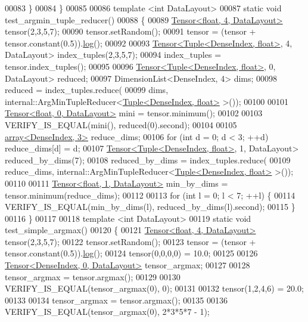 \begin{DoxyCode}
00083   \}
00084 \}
00085 
00086 \textcolor{keyword}{template} <\textcolor{keywordtype}{int} DataLayout>
00087 \textcolor{keyword}{static} \textcolor{keywordtype}{void} test\_argmin\_tuple\_reducer()
00088 \{
00089   \hyperlink{class_eigen_1_1_tensor}{Tensor<float, 4, DataLayout>} tensor(2,3,5,7);
00090   tensor.setRandom();
00091   tensor = (tensor + tensor.constant(0.5)).\hyperlink{structlog}{log}();
00092 
00093   \hyperlink{class_eigen_1_1_tensor}{Tensor<Tuple<DenseIndex, float>}, 4, DataLayout> index\_tuples(2,3,5,7);
00094   index\_tuples = tensor.index\_tuples();
00095 
00096   \hyperlink{class_eigen_1_1_tensor}{Tensor<Tuple<DenseIndex, float>}, 0, DataLayout> reduced;
00097   DimensionList<DenseIndex, 4> dims;
00098   reduced = index\_tuples.reduce(
00099       dims, internal::ArgMinTupleReducer<\hyperlink{struct_eigen_1_1_tuple}{Tuple<DenseIndex, float>} >());
00100 
00101   \hyperlink{class_eigen_1_1_tensor}{Tensor<float, 0, DataLayout>} mini = tensor.minimum();
00102 
00103   VERIFY\_IS\_EQUAL(mini(), reduced(0).second);
00104 
00105   \hyperlink{class_eigen_1_1array}{array<DenseIndex, 3>} reduce\_dims;
00106   \textcolor{keywordflow}{for} (\textcolor{keywordtype}{int} d = 0; d < 3; ++d) reduce\_dims[d] = d;
00107   \hyperlink{class_eigen_1_1_tensor}{Tensor<Tuple<DenseIndex, float>}, 1, DataLayout> reduced\_by\_dims(7);
00108   reduced\_by\_dims = index\_tuples.reduce(
00109       reduce\_dims, internal::ArgMinTupleReducer<\hyperlink{struct_eigen_1_1_tuple}{Tuple<DenseIndex, float>} >());
00110 
00111   \hyperlink{class_eigen_1_1_tensor}{Tensor<float, 1, DataLayout>} min\_by\_dims = tensor.minimum(reduce\_dims);
00112 
00113   \textcolor{keywordflow}{for} (\textcolor{keywordtype}{int} l = 0; l < 7; ++l) \{
00114     VERIFY\_IS\_EQUAL(min\_by\_dims(l), reduced\_by\_dims(l).second);
00115   \}
00116 \}
00117 
00118 \textcolor{keyword}{template} <\textcolor{keywordtype}{int} DataLayout>
00119 \textcolor{keyword}{static} \textcolor{keywordtype}{void} test\_simple\_argmax()
00120 \{
00121   \hyperlink{class_eigen_1_1_tensor}{Tensor<float, 4, DataLayout>} tensor(2,3,5,7);
00122   tensor.setRandom();
00123   tensor = (tensor + tensor.constant(0.5)).\hyperlink{structlog}{log}();
00124   tensor(0,0,0,0) = 10.0;
00125 
00126   \hyperlink{class_eigen_1_1_tensor}{Tensor<DenseIndex, 0, DataLayout>} tensor\_argmax;
00127 
00128   tensor\_argmax = tensor.argmax();
00129 
00130   VERIFY\_IS\_EQUAL(tensor\_argmax(0), 0);
00131 
00132   tensor(1,2,4,6) = 20.0;
00133 
00134   tensor\_argmax = tensor.argmax();
00135 
00136   VERIFY\_IS\_EQUAL(tensor\_argmax(0), 2*3*5*7 - 1);

\end{DoxyCode}
